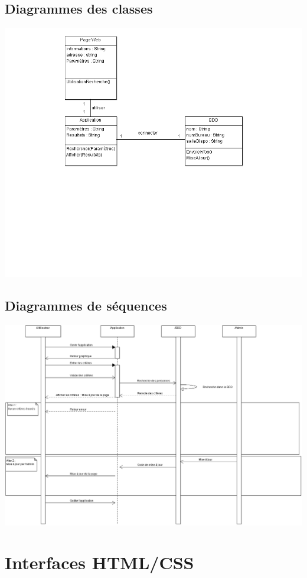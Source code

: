 \documentclass[11pt,a4paper]{report}
\begin{document}
		\section{Diagrammes des classes}
				\begin{center}
					\includegraphics[scale=0.6]{classes}
				\end{center}
		\section{Diagrammes de séquences}
		\begin{center}
			\includegraphics[angle=90,scale=0.45]{sequences}
		\end{center}
	\chapter{Interfaces HTML/CSS}
\end{document}
